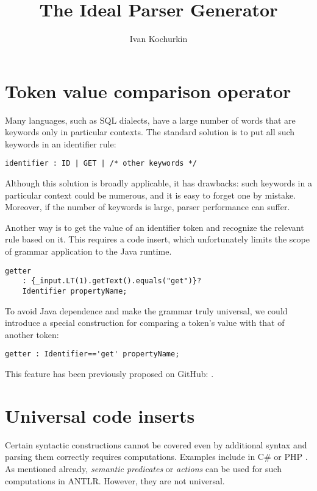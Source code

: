 \documentclass[sigplan,screen]{acmart}
\title{\LARGE \bf
The Ideal Parser Generator}
\author{Ivan Kochurkin}
\affiliation{%
  \institution{Positive Technologies}
  \city{Moscow}
  \country{Russia}
}
\begin{document}
\maketitle

\section{Token value comparison operator}

Many languages, such as SQL dialects, have a large number of words that
are keywords only in particular contexts. The standard solution is to
put all such keywords in an identifier rule:

\begin{verbatim}
identifier : ID | GET | /* other keywords */
\end{verbatim}

Although this solution is broadly applicable, it has drawbacks: such
keywords in a particular context could be numerous, and it is easy to
forget one by mistake. Moreover, if the number of keywords is large,
parser performance can suffer.

Another way is to get the value of an identifier token and recognize the
relevant rule based on it. This requires a code insert, which
unfortunately limits the scope of grammar application to the Java
runtime.

\begin{verbatim}
getter
    : {_input.LT(1).getText().equals("get")}?
    Identifier propertyName;
\end{verbatim}

To avoid Java dependence and make the grammar truly universal, we could
introduce a special construction for comparing a token's value with that
of another token:

\begin{verbatim}
getter : Identifier=='get' propertyName;
\end{verbatim}

This feature has been previously proposed on GitHub: \cite{token-value-comparison-operator}.

\section{Universal code inserts}

Certain syntactic constructions cannot be covered even by additional
syntax and parsing them correctly requires computations. Examples
include in C\# or PHP \cite{string-interpolation}. As mentioned already, \emph{semantic
predicates} or \emph{actions} can be used for such computations in
ANTLR. However, they are not universal.
\end{document}
